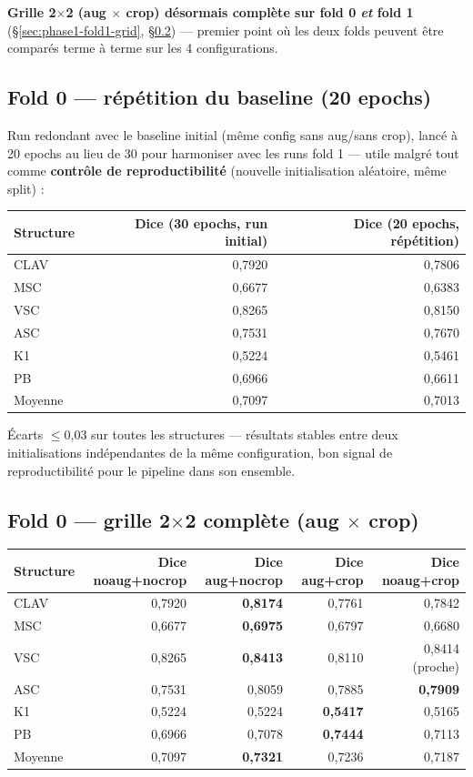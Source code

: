 \textbf{Grille 2$\times$2 (aug $\times$ crop) désormais complète sur fold 0 \emph{et}
fold 1} (\S\ref{sec:phase1-fold1-grid}, \S\ref{sec:phase1-fold0-grid}) --- premier
point où les deux folds peuvent être comparés terme à terme sur les 4
configurations.

\subsection{Fold 0 --- répétition du baseline (20 epochs)}

Run redondant avec le baseline initial (même config sans aug/sans crop), lancé à 20
epochs au lieu de 30 pour harmoniser avec les runs fold 1 --- utile malgré tout comme
\textbf{contrôle de reproductibilité} (nouvelle initialisation aléatoire, même
split) :

\begin{center}
\begin{tabular}{lrr}
\toprule
Structure & Dice (30 epochs, run initial) & Dice (20 epochs, répétition) \\
\midrule
CLAV & 0,7920 & 0,7806 \\
MSC  & 0,6677 & 0,6383 \\
VSC  & 0,8265 & 0,8150 \\
ASC  & 0,7531 & 0,7670 \\
K1   & 0,5224 & 0,5461 \\
PB   & 0,6966 & 0,6611 \\
\midrule
Moyenne & 0,7097 & 0,7013 \\
\bottomrule
\end{tabular}
\end{center}

Écarts $\leq$0,03 sur toutes les structures --- résultats stables entre deux
initialisations indépendantes de la même configuration, bon signal de
reproductibilité pour le pipeline dans son ensemble.

\subsection{Fold 0 --- grille 2$\times$2 complète (aug $\times$ crop)}
\label{sec:phase1-fold0-grid}

\begin{center}
\begin{tabular}{lrrrr}
\toprule
Structure & Dice noaug+nocrop & Dice aug+nocrop & Dice aug+crop & Dice noaug+crop \\
\midrule
CLAV & 0,7920 & \textbf{0,8174} & 0,7761 & 0,7842 \\
MSC  & 0,6677 & \textbf{0,6975} & 0,6797 & 0,6680 \\
VSC  & 0,8265 & \textbf{0,8413} & 0,8110 & 0,8414 (proche) \\
ASC  & 0,7531 & 0,8059 & 0,7885 & \textbf{0,7909}  \\
K1   & 0,5224 & 0,5224 & \textbf{0,5417} & 0,5165 \\
PB   & 0,6966 & 0,7078 & \textbf{0,7444} & 0,7113 \\
\midrule
Moyenne & 0,7097 & \textbf{0,7321} & 0,7236 & 0,7187 \\
\bottomrule
\end{tabular}
\end{center}

